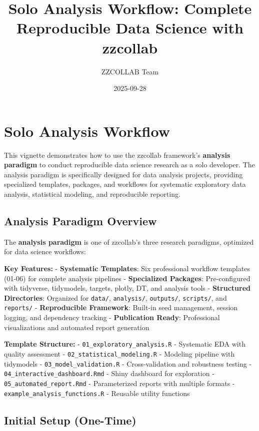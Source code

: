 \documentclass[
]{article}
\title{Solo Analysis Workflow: Complete Reproducible Data Science with
zzcollab}
\author{ZZCOLLAB Team}
\date{2025-09-28}
\begin{document}
\maketitle

\section{Solo Analysis Workflow}\label{solo-analysis-workflow}

This vignette demonstrates how to use the zzcollab framework's
\textbf{analysis paradigm} to conduct reproducible data science research
as a solo developer. The analysis paradigm is specifically designed for
data analysis projects, providing specialized templates, packages, and
workflows for systematic exploratory data analysis, statistical
modeling, and reproducible reporting.

\subsection{Analysis Paradigm
Overview}\label{analysis-paradigm-overview}

The \textbf{analysis paradigm} is one of zzcollab's three research
paradigms, optimized for data science workflows:

\textbf{Key Features:} - \textbf{Systematic Templates}: Six professional
workflow templates (01-06) for complete analysis pipelines -
\textbf{Specialized Packages}: Pre-configured with tidyverse,
tidymodels, targets, plotly, DT, and analysis tools - \textbf{Structured
Directories}: Organized for \texttt{data/}, \texttt{analysis/},
\texttt{outputs/}, \texttt{scripts/}, and \texttt{reports/} -
\textbf{Reproducible Framework}: Built-in seed management, session
logging, and dependency tracking - \textbf{Publication Ready}:
Professional visualizations and automated report generation

\textbf{Template Structure:} - \texttt{01\_exploratory\_analysis.R} -
Systematic EDA with quality assessment -
\texttt{02\_statistical\_modeling.R} - Modeling pipeline with tidymodels
- \texttt{03\_model\_validation.R} - Cross-validation and robustness
testing - \texttt{04\_interactive\_dashboard.Rmd} - Shiny dashboard for
exploration - \texttt{05\_automated\_report.Rmd} - Parameterized reports
with multiple formats - \texttt{example\_analysis\_functions.R} -
Reusable utility functions

\subsection{Initial Setup (One-Time)}\label{initial-setup-one-time}
\end{document}
